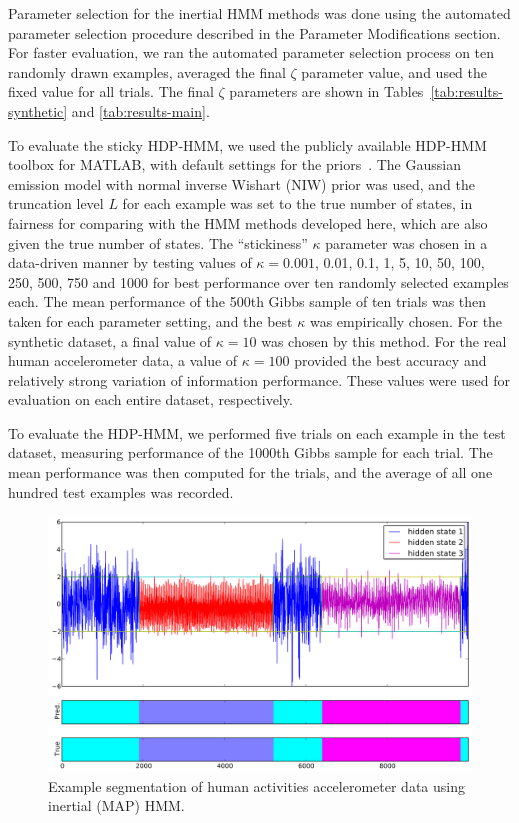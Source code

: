 \documentclass[letterpaper]{article}
\begin{document}
Parameter selection for the inertial HMM methods was done using the automated
parameter selection procedure described in the Parameter Modifications section. For faster evaluation, we ran 
the automated parameter selection process on ten randomly drawn examples, averaged 
the final $\zeta$ parameter value, and used the fixed value for all trials. The 
final $\zeta$ parameters are shown in Tables~\ref{tab:results-synthetic} and \ref{tab:results-main}.

To evaluate the sticky HDP-HMM, we used the publicly available HDP-HMM toolbox for MATLAB,
with default settings for the priors~\cite{HDP-HMM-TOOLKIT}. The Gaussian emission model with normal
inverse Wishart (NIW) prior was used, and the truncation level $L$ for each
example was set to the true number of states, in fairness for comparing with the
HMM methods developed here, which are also given the true number of states. The
``stickiness'' $\kappa$ parameter was chosen in a data-driven manner by testing
values of $\kappa=0.001$, 0.01, 0.1, 1, 5, 10, 50, 100, 250, 500, 750 and 1000 
for best performance over ten randomly selected examples each.
The mean performance of the 500th Gibbs sample of ten trials was then taken for
each parameter setting, and the best $\kappa$ was empirically chosen. For the
synthetic dataset, a final value of $\kappa=10$ was chosen by this method. For
the real human accelerometer data, a value of $\kappa=100$ provided the best
accuracy and relatively strong variation of information performance. These
values were used for evaluation on each entire dataset, respectively.

To evaluate the HDP-HMM, we performed five trials on each example in the test
dataset, measuring performance of the 1000th Gibbs sample for each trial. The
mean performance was then computed for the trials, and the average of all one
hundred test examples was recorded.

\begin{figure}[htbp]
\setlength{\abovecaptionskip}{0pt}
\setlength{\belowcaptionskip}{0cm}
  \centering
    \includegraphics[width=1.0\linewidth]{images/real_segmentation_result.pdf}    
    \caption{\small{Example segmentation of human activities accelerometer data using inertial (MAP) HMM.}}
    \label{fig:real-results-MAP}
\end{figure}
\end{document}
